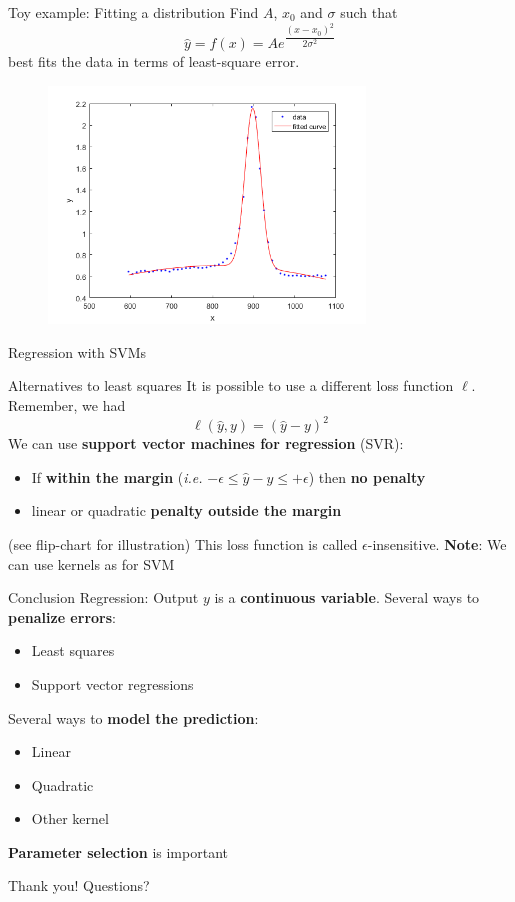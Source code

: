 \documentclass{beamer}
\begin{document}
\begin{frame}{Toy example: Fitting a distribution}
Find $A$, $x_0$ and $\sigma$ such that
$$ \hat{y} = f(x) =  A e^{\dfrac{\left( x - x_0 \right)^2}{2\sigma^2}}$$
best fits the data in terms of least-square error.
\begin{figure}
\centering
\includegraphics[width=0.75\textwidth]{images/fitted_gaussian.png}
\end{figure}
\end{frame}

\begin{frame}
\begin{center}
\Huge{Regression with SVMs}
\end{center}
\end{frame}

\begin{frame}{Alternatives to least squares}
It is possible to use a different loss function $\ell$. Remember, we had
$$ \ell \left( \hat{y}, y \right) = \left( \hat{y} - y\right)^2$$
\vfill
\pause
We can use \textbf{support vector machines for regression} (SVR):
\begin{itemize}
	\item If \textbf{within the margin} (\textit{i.e.} $ - \epsilon \leq \hat{y} - y \leq + \epsilon$) then \textbf{no penalty}
	\item linear or quadratic \textbf{penalty outside the margin}
\end{itemize}
(see flip-chart for illustration) 
\vfill
This loss function is called $\epsilon$-insensitive.
\pause
\vfill
\textbf{Note}: We can use kernels as for SVM
\end{frame}

\begin{frame}{Conclusion}
Regression: Output $y$ is a \textbf{continuous variable}.
\vfill
\pause
Several ways to \textbf{penalize errors}:
\begin{itemize}
	\item Least squares
	\item Support vector regressions
\end{itemize}
\vfill
\pause
Several ways to \textbf{model the prediction}:
\begin{itemize}
	\item Linear
	\item Quadratic
	\item Other kernel
\end{itemize}
\vfill
\pause
\textbf{Parameter selection} is important
\end{frame}


\begin{frame}
\begin{center}
\Huge{Thank you! Questions?}
\end{center}
\end{frame}
\end{document}
